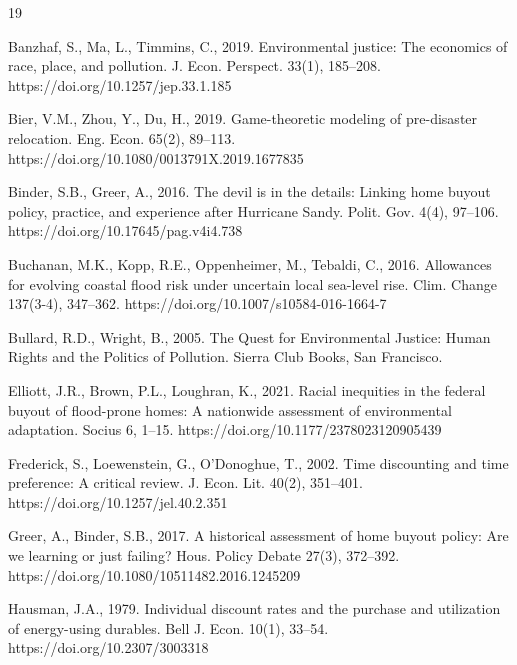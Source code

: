 \documentclass[preprint,12pt,authoryear]{elsarticle}
\begin{document}
\begin{thebibliography}{19}

Banzhaf, S., Ma, L., Timmins, C., 2019. Environmental justice: The economics of race, place, and pollution. J. Econ. Perspect. 33(1), 185--208. https://doi.org/10.1257/jep.33.1.185

Bier, V.M., Zhou, Y., Du, H., 2019. Game-theoretic modeling of pre-disaster relocation. Eng. Econ. 65(2), 89--113. https://doi.org/10.1080/0013791X.2019.1677835

Binder, S.B., Greer, A., 2016. The devil is in the details: Linking home buyout policy, practice, and experience after Hurricane Sandy. Polit. Gov. 4(4), 97--106. https://doi.org/10.17645/pag.v4i4.738

Buchanan, M.K., Kopp, R.E., Oppenheimer, M., Tebaldi, C., 2016. Allowances for evolving coastal flood risk under uncertain local sea-level rise. Clim. Change 137(3-4), 347--362. https://doi.org/10.1007/s10584-016-1664-7

Bullard, R.D., Wright, B., 2005. The Quest for Environmental Justice: Human Rights and the Politics of Pollution. Sierra Club Books, San Francisco.

Elliott, J.R., Brown, P.L., Loughran, K., 2021. Racial inequities in the federal buyout of flood-prone homes: A nationwide assessment of environmental adaptation. Socius 6, 1--15. https://doi.org/10.1177/2378023120905439

Frederick, S., Loewenstein, G., O'Donoghue, T., 2002. Time discounting and time preference: A critical review. J. Econ. Lit. 40(2), 351--401. https://doi.org/10.1257/jel.40.2.351

Greer, A., Binder, S.B., 2017. A historical assessment of home buyout policy: Are we learning or just failing? Hous. Policy Debate 27(3), 372--392. https://doi.org/10.1080/10511482.2016.1245209

Hausman, J.A., 1979. Individual discount rates and the purchase and utilization of energy-using durables. Bell J. Econ. 10(1), 33--54. https://doi.org/10.2307/3003318


\end{thebibliography}
\end{document}
